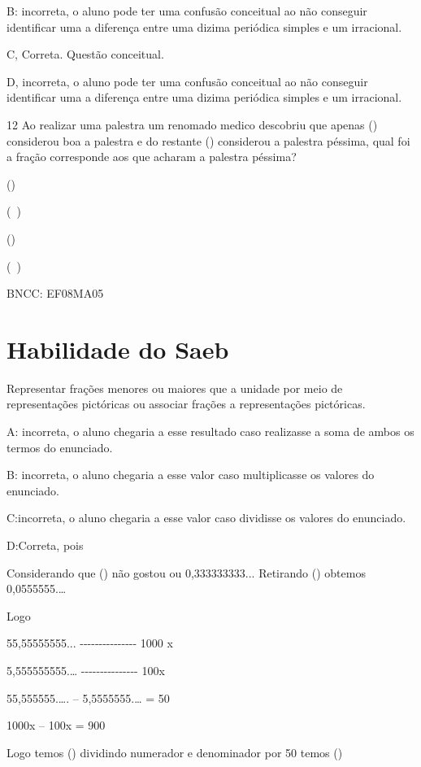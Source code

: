 B: incorreta, o aluno pode ter uma confusão conceitual ao não conseguir
identificar uma a diferença entre uma dizima periódica simples e um
irracional.

C, Correta. Questão conceitual.

D, incorreta, o aluno pode ter uma confusão conceitual ao não conseguir
identificar uma a diferença entre uma dizima periódica simples e um
irracional.

\num{12} Ao realizar uma palestra um renomado medico descobriu que apenas
() considerou boa a palestra e do restante ()
considerou a palestra péssima, qual foi a fração corresponde aos que
acharam a palestra péssima?

\item ()
\item (\ )
\item ()
\item (\ )

BNCC: EF08MA05

\section{Habilidade do Saeb} Representar frações menores ou maiores que a unidade
por meio de representações pictóricas ou associar frações a
representações pictóricas.

A: incorreta, o aluno chegaria a esse resultado caso realizasse a soma
de ambos os termos do enunciado.

B: incorreta, o aluno chegaria a esse valor caso multiplicasse os
valores do enunciado.

C:incorreta, o aluno chegaria a esse valor caso dividisse os valores do
enunciado.

D:Correta, pois

Considerando que () não gostou ou 0,333333333... Retirando
() obtemos 0,0555555.\ldots{}

Logo

55,55555555... -\/-\/-\/-\/-\/-\/-\/-\/-\/-\/-\/-\/-\/-\/- 1000 x

5,555555555.\ldots{} -\/-\/-\/-\/-\/-\/-\/-\/-\/-\/-\/-\/-\/-\/- 100x

55,555555.\ldots. -- 5,5555555.\ldots{} = 50

1000x -- 100x = 900

Logo temos () dividindo numerador e denominador por 50
temos ()

